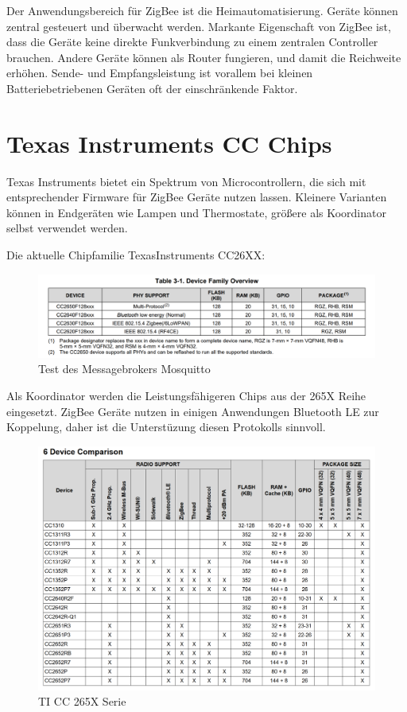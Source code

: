 Der Anwendungsbereich für ZigBee ist die Heimautomatisierung. Geräte können zentral gesteuert und überwacht werden. 
Markante Eigenschaft von ZigBee ist, dass die Geräte keine direkte Funkverbindung
zu einem zentralen Controller brauchen. Andere Geräte können als Router fungieren, und damit die Reichweite erhöhen. Sende- und Empfangsleistung
ist vorallem bei kleinen Batteriebetriebenen Geräten oft der einschränkende Faktor.


\section{Texas Instruments CC Chips}

Texas Instruments bietet ein Spektrum von Microcontrollern, die sich mit entsprechender Firmware für ZigBee Geräte 
nutzen lassen. Kleinere Varianten können in Endgeräten wie Lampen und Thermostate, größere als Koordinator selbst verwendet werden.

Die aktuelle Chipfamilie TexasInstruments CC26XX:

\begin{figure}[H]
  \centering
  \includegraphics[width=1\textwidth]{media/table26xx.png}
  \caption{Test des Messagebrokers Mosquitto}
\end{figure}

Als Koordinator werden die Leistungsfähigeren Chips aus der 265X Reihe eingesetzt. ZigBee Geräte nutzen in einigen
Anwendungen Bluetooth LE zur Koppelung, daher ist die Unterstüzung diesen Protokolls sinnvoll.

\begin{figure}[H]
  \centering
  \includegraphics[width=1\textwidth]{media/table265x.png}
  \caption{TI CC 265X Serie}
\end{figure}

